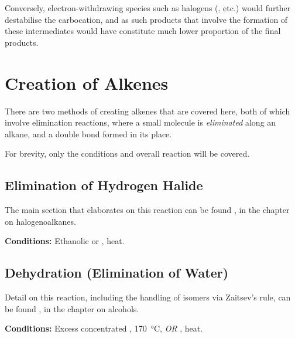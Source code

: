 			Conversely, electron-withdrawing species such as halogens (, \ch{\chlorine} etc.) would further destabilise
			the carbocation, and as such products that involve the formation of these intermediates would have constitute much
			lower proportion of the final products.


	\pagebreak
	\section{Creation of Alkenes}

		There are two methods of creating alkenes that are covered here, both of which involve elimination reactions, where a small
		molecule is \textit{eliminated} along an alkane, and a double bond formed in its place.

		For brevity, only the conditions and overall reaction will be covered.

		\subsection{Elimination of Hydrogen Halide}

			The main section that elaborates on this reaction can be found \hyperlink{HydrogenHalideElimination}{}, in the
			chapter on halogenoalkanes.


			\vspace{1.5em}
			\vbox{\textbf{Conditions:}	\tabto{35mm}Ethanolic  or , heat.}




		\subsection{Dehydration (Elimination of Water)}

			Detail on this reaction, including the handling of isomers via Zaitsev's rule, can be found
			\hyperlink{AlcoholDehydration}{}, in the chapter on alcohols.


			\vspace{1.5em}
			\vbox{\textbf{Conditions:}	\tabto{35mm}Excess concentrated , \SI{170}{\celsius}, \textit{OR}
										\tabto{35mm}, heat.}

